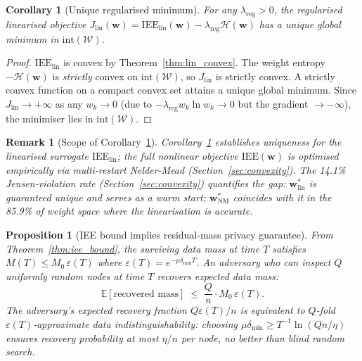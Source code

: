 \documentclass[review,12pt]{elsarticle}
\newcommand{\bfw}{\mathbf{w}}
\newcommand{\IEE}{\mathrm{IEE}}
\newtheorem{proposition}{Proposition}
\newtheorem{corollary}{Corollary}
\newtheorem{remark}{Remark}
\begin{document}
\begin{corollary}[Unique regularised minimum]
\label{cor:unique}
For any $\lambda_{\mathrm{reg}} > 0$, the regularised linearised objective
$J_{\mathrm{lin}}(\bfw) = \IEE_{\mathrm{lin}}(\bfw) - \lambda_{\mathrm{reg}}\mathcal{H}(\bfw)$
has a unique global minimum in $\mathrm{int}(\mathcal{W})$.
\end{corollary}

\begin{proof}
$\IEE_{\mathrm{lin}}$ is convex by Theorem~\ref{thm:lin_convex}.
The weight entropy $-\mathcal{H}(\bfw)$ is \emph{strictly} convex on
$\mathrm{int}(\mathcal{W})$, so $J_{\mathrm{lin}}$ is strictly convex.
A strictly convex function on a compact convex set attains a unique
global minimum.  Since $J_{\mathrm{lin}} \to +\infty$ as any
$w_k \to 0$ (due to $-\lambda_{\mathrm{reg}} w_k \ln w_k \to 0$ but
the gradient $\to -\infty$), the minimiser lies in
$\mathrm{int}(\mathcal{W})$.
\end{proof}

\begin{remark}[Scope of Corollary~\ref{cor:unique}]
\label{rem:corollary_scope}
Corollary~\ref{cor:unique} establishes uniqueness for the
\emph{linearised} surrogate $\IEE_{\mathrm{lin}}$; the full nonlinear
objective $\IEE(\bfw)$ is optimised empirically via
multi-restart Nelder-Mead (Section~\ref{sec:convexity}).
The 14.1\% Jensen-violation rate (Section~\ref{sec:convexity})
quantifies the gap: $\bfw^*_{\mathrm{lin}}$ is guaranteed unique and
serves as a warm start; $\bfw^*_{\mathrm{NM}}$ coincides with it in
the 85.9\% of weight space where the linearisation is accurate.
\end{remark}

\begin{proposition}[IEE bound implies residual-mass privacy guarantee]
\label{prop:privacy}
From Theorem~\ref{thm:iee_bound}, the surviving data mass at time $T$
satisfies $M(T) \leq M_0\,\varepsilon(T)$ where
$\varepsilon(T) = e^{-\mu\delta_{\min}T}$.
An adversary who can inspect $Q$ uniformly random nodes at time $T$
recovers expected data mass:
\begin{equation}
  \mathbb{E}[\text{recovered mass}] \;\leq\;
    \frac{Q}{n}\cdot M_0\,\varepsilon(T).
  \label{eq:mass_recovery}
\end{equation}
The adversary's expected \emph{recovery fraction} $Q\varepsilon(T)/n$
is equivalent to $Q$-fold $\varepsilon(T)$-approximate data indistinguishability:
choosing $\mu\delta_{\min} \geq T^{-1}\ln(Qn/\eta)$ ensures recovery
probability at most $\eta/n$ per node, no better than blind random search.
\end{proposition}
\end{document}

